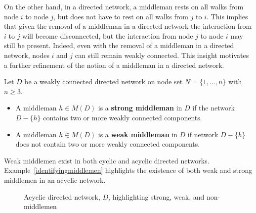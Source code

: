 On the other hand, in a directed network, a middleman rests on all walks from node $i$ to node $j$, but does not have to rest on all walks from $j$ to $i$. This implies that given the removal of a middleman in a directed network the interaction from $i$ to $j$ will become disconnected, but the interaction from node $j$ to node $i$ may still be present. Indeed, even with the removal of a middleman in a directed network, nodes $i$ and $j$ can still remain weakly connected. This insight motivates a further refinement of the notion of a middleman in a directed network.

\begin{definition} \label{strongweakmiddlemen}
Let $D$ be a weakly connected directed network on node set $N = \{ 1, \ldots ,n \}$ with $n \geqslant 3$.
\begin{itemize}
\item A middleman $h \in M(D)$ is a \textbf{strong middleman} in $D$ if the network $D - \{h\}$ contains two or more weakly connected components.

\item A middleman $h \in M(D)$ is a \textbf{weak middleman} in $D$ if network $D - \{h\}$ does not contain two or more weakly connected components.
\end{itemize}
\end{definition}

Weak middlemen exist in both cyclic and acyclic directed networks. Example~\ref{identifyingmiddlemen} highlights the existence of both weak and strong middlemen in an acyclic network.

\begin{figure}[t]
\begin{center}
\end{center}
\caption[Acyclic directed network highlighting strong, weak, and non-middlemen]{Acyclic directed network, $D$, highlighting strong, weak, and non-middlemen}
\label{weakmm}
\end{figure}

